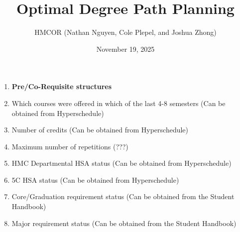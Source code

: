 \documentclass[12pt]{article}
\title{Optimal Degree Path Planning}
\date{November 19, 2025}
\author{HMCOR (Nathan Nguyen, Cole Plepel, and Joshua Zhong)}
\begin{document}
\maketitle

\iffalse
\begin{enumerate}
    \item \textbf{Pre/Co-Requisite structures}
    \item Which courses were offered in which of the last 4-8 semesters (Can be obtained from Hyperschedule)
    \item Number of credits (Can be obtained from Hyperschedule)
    \item Maximum number of repetitions (???)
    \item HMC Departmental HSA status (Can be obtained from Hyperschedule)
    \item 5C HSA status (Can be obtained from Hyperschedule)
    \item Core/Graduation requirement status (Can be obtained from the Student Handbook)
    \item Major requirement status (Can be obtained from the Student Handbook)
\end{enumerate}
\end{document}
